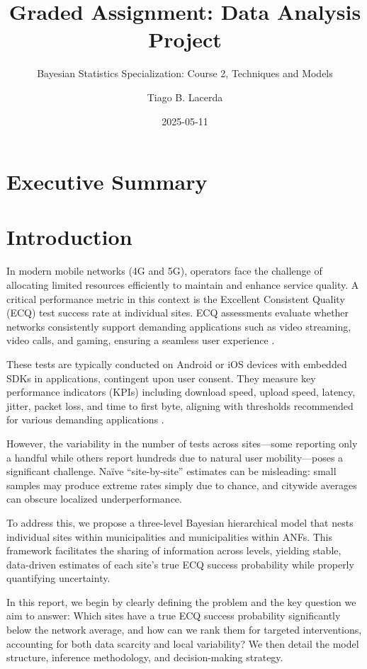 \documentclass[
]{article}
\title{Graded Assignment: Data Analysis Project}
\subtitle{Bayesian Statistics Specialization: Course 2, Techniques and
Models}
\author{Tiago B. Lacerda}
\date{2025-05-11}
\begin{document}
\maketitle

\hypertarget{executive-summary}{%
\section{Executive Summary}\label{executive-summary}}

\hypertarget{introduction}{%
\section{Introduction}\label{introduction}}

In modern mobile networks (4G and 5G), operators face the challenge of
allocating limited resources efficiently to maintain and enhance service
quality. A critical performance metric in this context is the Excellent
Consistent Quality (ECQ) test success rate at individual sites. ECQ
assessments evaluate whether networks consistently support demanding
applications such as video streaming, video calls, and gaming, ensuring
a seamless user experience .

These tests are typically conducted on Android or iOS devices with
embedded SDKs in applications, contingent upon user consent. They
measure key performance indicators (KPIs) including download speed,
upload speed, latency, jitter, packet loss, and time to first byte,
aligning with thresholds recommended for various demanding applications
.

However, the variability in the number of tests across sites---some
reporting only a handful while others report hundreds due to natural
user mobility---poses a significant challenge. Naïve ``site-by-site''
estimates can be misleading: small samples may produce extreme rates
simply due to chance, and citywide averages can obscure localized
underperformance.

To address this, we propose a three-level Bayesian hierarchical model
that nests individual sites within municipalities and municipalities
within ANFs. This framework facilitates the sharing of information
across levels, yielding stable, data-driven estimates of each site's
true ECQ success probability while properly quantifying uncertainty.

In this report, we begin by clearly defining the problem and the key
question we aim to answer: Which sites have a true ECQ success
probability significantly below the network average, and how can we rank
them for targeted interventions, accounting for both data scarcity and
local variability? We then detail the model structure, inference
methodology, and decision-making strategy.
\end{document}
